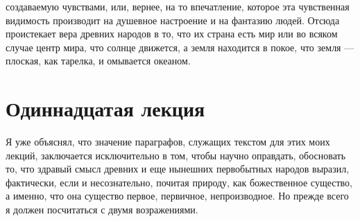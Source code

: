 \documentclass[12pt]{article}
\begin{document}
создаваемую чувствами, или, вернее, на то впечатление, которое эта чувственная видимость производит на душевное настроение и на фантазию людей. Отсюда проистекает вера древних народов в то, что их страна есть мир или во всяком случае центр мира, что солнце движется, а земля находится в покое, что земля --- плоская, как тарелка, и омывается океаном. 

\section*{Одиннадцатая лекция}

Я уже объяснял, что значение параграфов, служащих текстом для этих моих лекций, заключается исключительно в том, чтобы научно оправдать, обосновать то, что здравый смысл древних и еще нынешних первобытных народов выразил, фактически, если и несознательно, почитая природу, как божественное существо, а именно, что она существо первое, первичное, непроизводное. Но прежде всего я должен посчитаться с двумя возражениями. 
\end{document}
